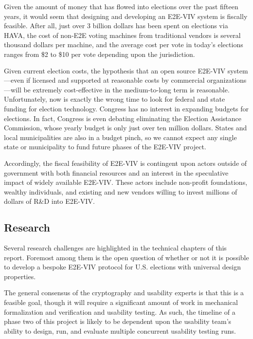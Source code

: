 Given the amount of money that has flowed into elections over the past
fifteen years, it would seem that designing and developing an E2E-VIV
system is fiscally feasible. After all, just over 3 billion dollars
has been spent on elections via HAVA, the cost of non-E2E voting
machines from traditional vendors is several thousand dollars per
machine, and the average cost per vote in today's elections ranges
from \$2 to \$10 per vote depending upon the jurisdiction.

Given current election costs, the hypothesis that an open source
E2E-VIV system---even if licensed and supported at reasonable costs by
commercial organizations---will be extremely cost-effective in the
medium-to-long term is reasonable. Unfortunately, now is exactly the
wrong time to look for federal and state funding for election
technology.  Congress has no interest in expanding budgets for
elections. In fact, Congress is even debating eliminating the Election
Assistance Commission, whose yearly budget is only just over ten
million dollars. States and local municipalities are also in a budget
pinch, so we cannot expect any single state or municipality to fund
future phases of the E2E-VIV project.

Accordingly, the fiscal feasibility of E2E-VIV is contingent upon
actors outside of government with both financial resources and an
interest in the speculative impact of widely available E2E-VIV.  These
actors include non-profit foundations, wealthy individuals, and
existing and new vendors willing to invest millions of dollars of R\&D
into E2E-VIV.

\subsection{Research}

Several research challenges are highlighted in the technical chapters
of this report.  Foremost among them is the open question of whether
or not it is possible to develop a bespoke E2E-VIV protocol for
U.S. elections with universal design properties.

The general consensus of the cryptography and usability experts is
that this is a feasible goal, though it will require a significant
amount of work in mechanical formalization and verification and
usability testing. As such, the timeline of a phase two of this
project is likely to be dependent upon the usability team's ability to
design, run, and evaluate multiple concurrent usability testing runs.


